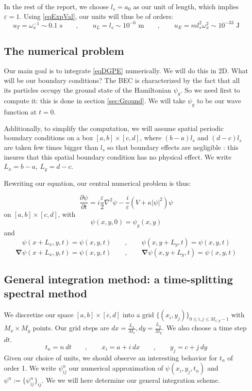 \documentclass{article}
\begin{document}
\bigskip
In the rest of the report, we choose $l_s=a_0$ as our unit of length, which implies $\varepsilon=1$. Using \eqref{eqExpVal}, our units will thus be of orders:
$$
u_T=\omega_x^{-1}\sim0.1\text{ s}\qquad,\qquad u_L=l_s\sim10^{-6}\text{ m}\qquad,\qquad u_E=m l_s^2 \omega_x^2\sim10^{-33}\text{ J}
$$

\subsection{The numerical problem}
Our main goal is to integrate \eqref{eqDGPE} numerically. We will do this in 2D. What will be our boundary conditions? The BEC is characterized by the fact that all its particles occupy the ground state of the Hamiltonian $\psi_g$. So we need first to compute it: this is done in section \ref{sec:Ground}. We will take $\psi_g$ to be our wave function at $t=0$. \par
Additionally, to simplify the computation, we will assume spatial periodic boundary conditions on a box $\left[a,b\right]\times\left[c,d\right]$, where $(b-a)l_s$ and $(d-c)l_s$ are taken few times bigger than $l_s$ so that boundary effects are negligible : this insures that this spatial boundary condition has no physical effect. We write $L_x=b-a,~L_y=d-c$.

\bigskip
Rewriting our equation, our central numerical problem is thus:
\begin{framed}
$$
\frac{\partial \psi}{\partial t}=i\frac{\varepsilon}{2} \nabla^{2} \psi-\frac{i}{\varepsilon}\left(V +\kappa|\psi|^{2}\right) \psi
$$
on $\left[a,b\right]\times\left[c,d\right]$, with
$$
\psi(x,y,0)=\psi_g(x,y)
$$
and
$$
\psi(x+L_x,y,t)=\psi(x,y,t)\qquad,\qquad \psi(x,y+L_y,t)=\psi(x,y,t)
$$
$$
\boldsymbol{\nabla}\psi(x+L_x,y,t)=\psi(x,y,t)\qquad,\qquad \boldsymbol{\nabla}\psi(x,y+L_y,t)=\psi(x,y,t) 
$$
\end{framed}



\subsection{General integration method: a time-splitting spectral method}
We discretize our space $\left[a,b\right]\times\left[c,d\right]$ into a grid $\{(x_i,y_j)\}_{0\leq i,j\leq M_{x,y}-1}$ with $M_x\times M_y$ points. Our grid steps are $dx=\frac{L_x}{M_x}, dy=\frac{L_y}{M_y}$. We also choose a time step $dt$.
$$
t_n=n~dt\qquad,\qquad x_i=a+ i~dx\qquad,\qquad y_j=c+ j~dy
$$
Given our choice of units, we should observe an interesting behavior for $t_n$ of order 1. We write $\psi^n_{ij}$ our numerical approximation of $\psi(x_i,y_j,t_n)$ and $\psi^n:=\{\psi^n_{ij}\}_{ij}$. We we will here determine our general integration scheme.
\end{document}
